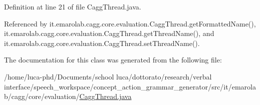 Definition at line 21 of file Cagg\-Thread.\-java.



Referenced by it.\-emarolab.\-cagg.\-core.\-evaluation.\-Cagg\-Thread.\-get\-Formatted\-Name(), it.\-emarolab.\-cagg.\-core.\-evaluation.\-Cagg\-Thread.\-get\-Thread\-Name(), and it.\-emarolab.\-cagg.\-core.\-evaluation.\-Cagg\-Thread.\-set\-Thread\-Name().



The documentation for this class was generated from the following file\-:\begin{DoxyCompactItemize}
\item 
/home/luca-\/phd/\-Documents/school luca/dottorato/research/verbal interface/speech\-\_\-workspace/concept\-\_\-action\-\_\-grammar\-\_\-generator/src/it/emarolab/cagg/core/evaluation/\hyperlink{CaggThread_8java}{Cagg\-Thread.\-java}\end{DoxyCompactItemize}
